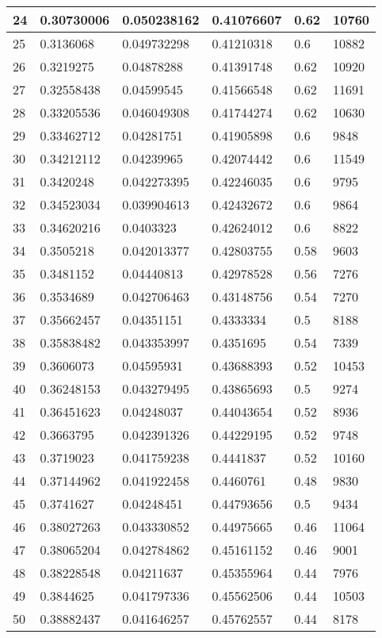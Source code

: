 \begin{longtable}{|l|l|l|l|l|l|}
24 & 0.30730006 & 0.050238162 & 0.41076607 & 0.62 & 10760 \\ \hline 
25 & 0.3136068 & 0.049732298 & 0.41210318 & 0.6 & 10882 \\ \hline 
26 & 0.3219275 & 0.04878288 & 0.41391748 & 0.62 & 10920 \\ \hline 
27 & 0.32558438 & 0.04599545 & 0.41566548 & 0.62 & 11691 \\ \hline 
28 & 0.33205536 & 0.046049308 & 0.41744274 & 0.62 & 10630 \\ \hline 
29 & 0.33462712 & 0.04281751 & 0.41905898 & 0.6 & 9848 \\ \hline 
30 & 0.34212112 & 0.04239965 & 0.42074442 & 0.6 & 11549 \\ \hline 
31 & 0.3420248 & 0.042273395 & 0.42246035 & 0.6 & 9795 \\ \hline 
32 & 0.34523034 & 0.039904613 & 0.42432672 & 0.6 & 9864 \\ \hline 
33 & 0.34620216 & 0.0403323 & 0.42624012 & 0.6 & 8822 \\ \hline 
34 & 0.3505218 & 0.042013377 & 0.42803755 & 0.58 & 9603 \\ \hline 
35 & 0.3481152 & 0.04440813 & 0.42978528 & 0.56 & 7276 \\ \hline 
36 & 0.3534689 & 0.042706463 & 0.43148756 & 0.54 & 7270 \\ \hline 
37 & 0.35662457 & 0.04351151 & 0.4333334 & 0.5 & 8188 \\ \hline 
38 & 0.35838482 & 0.043353997 & 0.4351695 & 0.54 & 7339 \\ \hline 
39 & 0.3606073 & 0.04595931 & 0.43688393 & 0.52 & 10453 \\ \hline 
40 & 0.36248153 & 0.043279495 & 0.43865693 & 0.5 & 9274 \\ \hline 
41 & 0.36451623 & 0.04248037 & 0.44043654 & 0.52 & 8936 \\ \hline 
42 & 0.3663795 & 0.042391326 & 0.44229195 & 0.52 & 9748 \\ \hline 
43 & 0.3719023 & 0.041759238 & 0.4441837 & 0.52 & 10160 \\ \hline 
44 & 0.37144962 & 0.041922458 & 0.4460761 & 0.48 & 9830 \\ \hline 
45 & 0.3741627 & 0.04248451 & 0.44793656 & 0.5 & 9434 \\ \hline 
46 & 0.38027263 & 0.043330852 & 0.44975665 & 0.46 & 11064 \\ \hline 
47 & 0.38065204 & 0.042784862 & 0.45161152 & 0.46 & 9001 \\ \hline 
48 & 0.38228548 & 0.04211637 & 0.45355964 & 0.44 & 7976 \\ \hline 
49 & 0.3844625 & 0.041797336 & 0.45562506 & 0.44 & 10503 \\ \hline 
50 & 0.38882437 & 0.041646257 & 0.45762557 & 0.44 & 8178 \\ \hline 
\end{longtable}